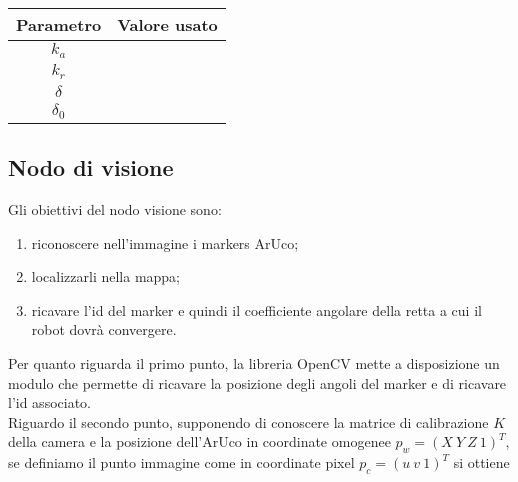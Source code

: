 \begin{table} [H]
    \centering
    \begin{tabular}{|cc|}
    \hline
        Parametro & Valore usato \\  \hline
        $k_a$ &      \\  \hline
        $k_r$ &    \\  \hline
        $\delta$ &    \\  \hline
        $\delta_0$ &    \\  \hline
    \end{tabular}
\end{table}

\subsection{Nodo di visione}
Gli obiettivi del nodo visione sono:
\begin{enumerate}
  \item riconoscere nell'immagine i markers ArUco;
  \item localizzarli nella mappa;
  \item ricavare l'id del marker e quindi il coefficiente angolare della retta a cui il robot dovrà convergere.
\end{enumerate}
  Per quanto riguarda il primo punto, la libreria OpenCV \cite{opencv_library} mette a disposizione un modulo che permette di ricavare la posizione degli angoli del 
  marker e di ricavare l'id associato. \\
  Riguardo il secondo punto, supponendo di conoscere la matrice di calibrazione $K$ della camera \cite{multiple_view} e la posizione dell'ArUco in coordinate omogenee 
  $p_w = (X \: Y \: Z \: 1 )^T$, se definiamo il punto immagine come in coordinate pixel $ p_c =  (u \: v \: 1)^T$ si ottiene 

